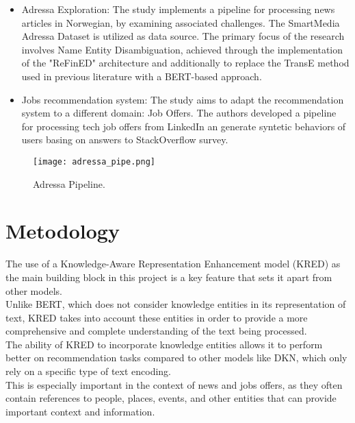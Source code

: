 \documentclass[conference]{IEEEtran}
\begin{document}
\begin{itemize}
    \item Adressa Exploration: The study implements a pipeline for processing news articles in Norwegian, by examining associated challenges. The SmartMedia Adressa Dataset\cite{gulla2017adressa} is utilized as data source. The primary focus of the research involves Name Entity Disambiguation, achieved through the implementation of the "ReFinED" \cite{ayoola-etal-2022-refined} architecture and additionally to replace the TransE method \cite{bordes2013translating} used in previous literature with a BERT-based approach.
    \item Jobs recommendation system: The study aims to adapt the recommendation system to a different domain: Job Offers.
    The authors developed a pipeline for processing tech job offers from LinkedIn an generate syntetic behaviors of users basing on answers to StackOverflow survey.
\end{itemize}

\begin{figure*}[t]
    \centering
    \texttt{[image: adressa\_pipe.png]}
    \caption{Adressa Pipeline.}
    \label{fig:adressa_pipe}
\end{figure*}



\section{Metodology}
The use of a Knowledge-Aware Representation Enhancement model (KRED) as the main building block in this project is a key feature that sets it apart from other models. \\
Unlike BERT, which does not consider knowledge entities in its representation of text, KRED takes into account these entities in order to provide a more comprehensive and complete understanding of the text being processed. \\
The ability of KRED to incorporate knowledge entities allows it to perform better on recommendation tasks compared to other models like DKN, which only rely on a specific type of text encoding. \\
This is especially important in the context of news and jobs offers, as they often contain references to people, places, events, and other entities that can provide important context and information. \\
\end{document}
